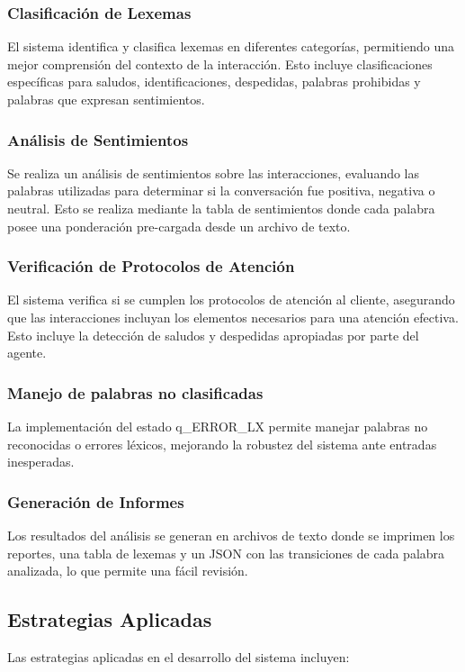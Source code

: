 \documentclass[12pt,a4paper]{article}
\begin{document}
\subsubsection{Clasificación de Lexemas}
El sistema identifica y clasifica lexemas en diferentes categorías, permitiendo una mejor
comprensión del contexto de la interacción. Esto incluye clasificaciones específicas para
saludos, identificaciones, despedidas, palabras prohibidas y palabras que expresan
sentimientos.

\subsubsection{Análisis de Sentimientos}
Se realiza un análisis de sentimientos sobre las interacciones, evaluando las palabras
utilizadas para determinar si la conversación fue positiva, negativa o neutral. Esto se realiza
mediante la tabla de sentimientos donde cada palabra posee una ponderación pre-cargada desde un
archivo de texto.

\subsubsection{Verificación de Protocolos de Atención}
El sistema verifica si se cumplen los protocolos de atención al cliente, asegurando que las
interacciones incluyan los elementos necesarios para una atención efectiva. Esto incluye la
detección de saludos y despedidas apropiadas por parte del agente.

\subsubsection{Manejo de palabras no clasificadas}
La implementación del estado q\_ERROR\_LX permite manejar palabras no reconocidas o errores
léxicos, mejorando la robustez del sistema ante entradas inesperadas.

\subsubsection{Generación de Informes}
Los resultados del análisis se generan en archivos de texto donde se imprimen los reportes, una
tabla de lexemas y un JSON con las transiciones de cada palabra analizada, lo que permite una
fácil revisión.

\subsection{Estrategias Aplicadas}
Las estrategias aplicadas en el desarrollo del sistema incluyen:
\end{document}
